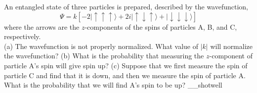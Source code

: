 An entangled state of three particles is prepared, described by the 
wavefunction,
\begin{equation*}
  \Psi = k\left[
     -2|\uparrow\uparrow\uparrow\rangle 
    +2i|\uparrow\downarrow\uparrow\rangle 
    +|\downarrow\downarrow\downarrow\rangle
  \right]
\end{equation*}
where the arrows are the $z$-components of the spins of particles A, B, and C, respectively.\\
%
(a) The wavefunction is not properly normalized.
What value of $|k|$ will normalize the wavefunction?\answercheck\hwendpart
%
(b) What is the probability that measuring the $z$-component of 
particle A's spin will give spin up?\answercheck\hwendpart
%
(c) Suppose that we first measure the spin of particle C and find that it is down,
and then we measure the spin of particle A. What is the probability that we will
find A's spin to be up?\answercheck\hwendpart
__shotwell
